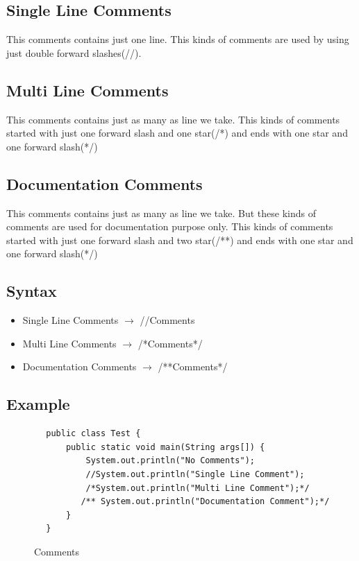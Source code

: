 \documentclass[openany]{book}  %
\begin{document}
\subsection{Single Line Comments}
This comments contains just one line. This kinds of comments are used by using just double forward slashes(//).
% 
%
\subsection{Multi Line Comments}
This comments contains just as many as line we take. This kinds of comments started with just one forward slash and one star(/*) and ends with one star and one forward slash(*/)
% 
%
\subsection{Documentation Comments}
This comments contains just as many as line we take. But these kinds of comments are used for documentation purpose only.
This kinds of comments started with just one forward slash and two star(/**) and ends with one star and one forward slash(*/)
% 
%
\subsection{Syntax}
\begin{itemize}
    \item Single Line Comments $\to$ //Comments
    \item Multi Line Comments $\to$ /*Comments*/
    \item Documentation Comments $\to$ /**Comments*/
\end{itemize}
% 
%
\subsection{Example}
\begin{center}
    \begin{verbatim}
        public class Test {
            public static void main(String args[]) {
                System.out.println("No Comments");
                //System.out.println("Single Line Comment");
                /*System.out.println("Multi Line Comment");*/
               /** System.out.println("Documentation Comment");*/
            }
        }
    \end{verbatim}
\end{center}
% 
% 
\begin{figure}[htbp]
    \begin{center}
        \caption{Comments\cite{Ref3}}
    \end{center}
\end{figure}
% 
% 
\end{document}
